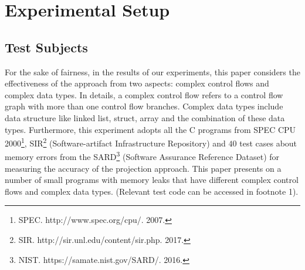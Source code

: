 \section{Experimental Setup}\label{sec:setup}


\subsection{Test Subjects}\label{ssec:ts}
For the sake of fairness, in the results of our experiments, this paper considers the effectiveness of the approach from two aspects: complex control flows and complex data types. In details, a complex control flow refers to a control flow graph with more than one control flow branches. Complex data types include data structure like linked list, struct, array and the combination of these data types. Furthermore, this experiment adopts all the C programs from SPEC CPU 2000\footnote{SPEC. http://www.spec.org/cpu/. 2007.}, SIR\footnote{SIR. http://sir.unl.edu/content/sir.php. 2017.} (Software-artifact Infrastructure Repository) and $40$ test cases about memory errors from the SARD\footnote{NIST. https://samate.nist.gov/SARD/. 2016.} (Software Assurance Reference Dataset) for measuring the accuracy of the projection approach. This paper presents on a number of small programs with memory leaks that have different complex control flows and complex data types. (Relevant test code can be accessed in footnote 1).
